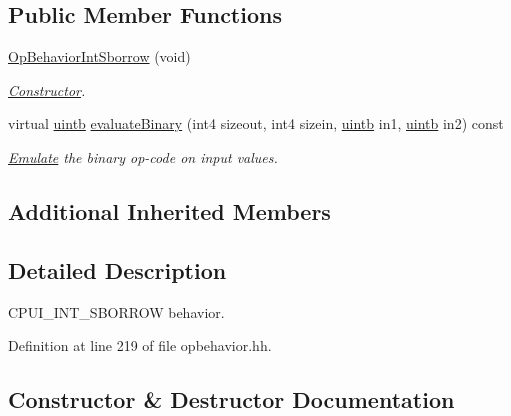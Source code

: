 \subsection*{Public Member Functions}
\begin{DoxyCompactItemize}
\item 
\mbox{\hyperlink{class_op_behavior_int_sborrow_aee4aa4a5f1073ebab60f325da3c2023e}{Op\+Behavior\+Int\+Sborrow}} (void)
\begin{DoxyCompactList}\small\item\em \mbox{\hyperlink{class_constructor}{Constructor}}. \end{DoxyCompactList}\item 
virtual \mbox{\hyperlink{types_8h_a2db313c5d32a12b01d26ac9b3bca178f}{uintb}} \mbox{\hyperlink{class_op_behavior_int_sborrow_a4c3b863f3cd6aaa1bc2cf40b88e49f59}{evaluate\+Binary}} (int4 sizeout, int4 sizein, \mbox{\hyperlink{types_8h_a2db313c5d32a12b01d26ac9b3bca178f}{uintb}} in1, \mbox{\hyperlink{types_8h_a2db313c5d32a12b01d26ac9b3bca178f}{uintb}} in2) const
\begin{DoxyCompactList}\small\item\em \mbox{\hyperlink{class_emulate}{Emulate}} the binary op-\/code on input values. \end{DoxyCompactList}\end{DoxyCompactItemize}
\subsection*{Additional Inherited Members}


\subsection{Detailed Description}
C\+P\+U\+I\+\_\+\+I\+N\+T\+\_\+\+S\+B\+O\+R\+R\+OW behavior. 

Definition at line 219 of file opbehavior.\+hh.



\subsection{Constructor \& Destructor Documentation}
\mbox{\label{class_op_behavior_int_sborrow_aee4aa4a5f1073ebab60f325da3c2023e}} 
